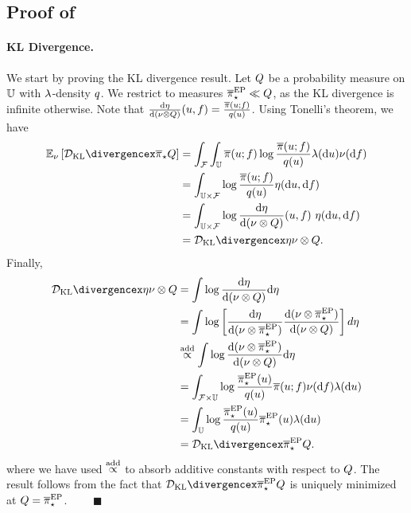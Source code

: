 \documentclass[12pt]{article}
\begin{document}
\subsection{Proof of }
\paragraph{KL Divergence.} We start by proving the KL divergence result.
Let $Q$ be a probability measure on $\mathbb{U}$ with 
$\lambda$-density $q$. We restrict to measures 
${\overline{\pi}}_{\star}^{\mathrm{EP}} \ll Q$, as the KL divergence is infinite otherwise. 
Note that 
$\frac{\d\emJoint}{\d(\emDist \otimes \qMeas)}(\Par, \targetTraj) = \frac{\postDensNorm(\Par; \targetTraj)}{\qDens(\Par)}$.
Using Tonelli's theorem, we have 
\begin{align*}
\E_{\emDist}\left[\KL{\postNormEm}{\qMeas} \right]
&= \int_{\emSpace} \int_{\parSpace} 
\postDensNorm(\Par; \targetTraj) \log \frac{\postDensNorm(\Par; \targetTraj)}{\qDens(\Par)}
\refMeas(\d\Par) \emDist(\d\targetTraj) \\
&= \int_{\parSpace \times \emSpace}  \log \frac{\postDensNorm(\Par; \targetTraj)}{\qDens(\Par)}
\emJoint(\d\Par, \d\targetTraj) \\
&= \int_{\parSpace \times \emSpace}  \log \frac{\d\emJoint}{\d(\emDist \otimes \qMeas)}(\Par, \targetTraj)
\ \emJoint(\d\Par, \d\targetTraj) \\
&= \KL{\emJoint}{\emDist \otimes \qMeas}.
\end{align*}
Finally, 
\begin{align*}
\KL{\emJoint}{\emDist \otimes \qMeas}
&= \int \log \frac{\d\emJoint}{\d(\emDist \otimes \qMeas)} \d\emJoint \\
&= \int \log \left[\frac{\d\emJoint}{\d(\emDist \otimes \postApproxEP)} \frac{\d(\emDist \otimes \postApproxEP)}{\d(\emDist \otimes \qMeas)}\right] d\emJoint \\
&\proptoAdd \int \log \frac{\d(\emDist \otimes \postApproxEP)}{\d(\emDist \otimes \qMeas)} \d\emJoint \\
&= \int_{\emSpace \times \parSpace} 
\log \frac{\postApproxEP(\Par)}{\qDens(\Par)} \postDensNorm(\Par; \targetTraj) \emDist(\d\targetTraj) \refMeas(\d\Par) \\
&= \int_{\parSpace} \log \frac{\postApproxEP(\Par)}{\qDens(\Par)} 
 \postApproxEP(\Par) \refMeas(\d\Par) \\
&= \KL{\postApproxEP}{\qMeas}.
\end{align*} 
where we have used $\overset{\mathrm{add}}{\propto}$ to absorb additive constants with respect to $Q$. The result follows 
from the fact that $\KL{\postApproxEP}{\qMeas}$ is uniquely minimized at $Q = {\overline{\pi}}_{\star}^{\mathrm{EP}}$. $\qquad \blacksquare$
\end{document}
